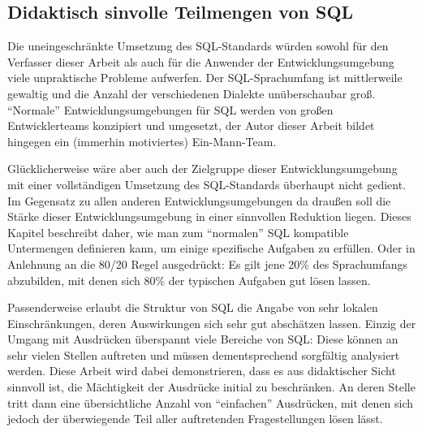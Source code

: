 \subsection{Didaktisch sinvolle Teilmengen von SQL}
\label{sec:sql-subset}


Die uneingeschränkte Umsetzung des SQL-Standards würden sowohl für den Verfasser dieser Arbeit als auch für die Anwender der Entwicklungsumgebung viele unpraktische Probleme aufwerfen. Der SQL-Sprachumfang ist mittlerweile gewaltig und die Anzahl der verschiedenen Dialekte unüberschaubar groß. ``Normale'' Entwicklungsumgebungen für SQL werden von großen Entwicklerteams konzipiert und umgesetzt, der Autor dieser Arbeit bildet hingegen ein (immerhin motiviertes) Ein-Mann-Team.

Glücklicherweise wäre aber auch der Zielgruppe dieser Entwicklungsumgebung mit einer vollständigen Umsetzung des SQL-Standards überhaupt nicht gedient. Im Gegensatz zu allen anderen Entwicklungsumgebungen da draußen soll die Stärke dieser Entwicklungsumgebung in einer sinnvollen Reduktion liegen. Dieses Kapitel beschreibt daher, wie man zum ``normalen'' SQL kompatible Untermengen definieren kann, um einige spezifische Aufgaben zu erfüllen. Oder in Anlehnung an die 80/20 Regel ausgedrückt: Es gilt jene 20\% des Sprachumfangs abzubilden, mit denen sich 80\% der typischen Aufgaben gut lösen lassen.

Passenderweise erlaubt die Struktur von SQL die Angabe von sehr lokalen Einschränkungen, deren Auswirkungen sich sehr gut abschätzen lassen. Einzig der Umgang mit Ausdrücken überspannt viele Bereiche von SQL: Diese können an sehr vielen Stellen auftreten und müssen dementsprechend sorgfältig analysiert werden. Diese Arbeit wird dabei demonstrieren, dass es aus didaktischer Sicht sinnvoll ist, die Mächtigkeit der Ausdrücke initial zu beschränken. An deren Stelle tritt dann eine übersichtliche Anzahl von ``einfachen'' Ausdrücken, mit denen sich jedoch der überwiegende Teil aller auftretenden Fragestellungen lösen lässt.


